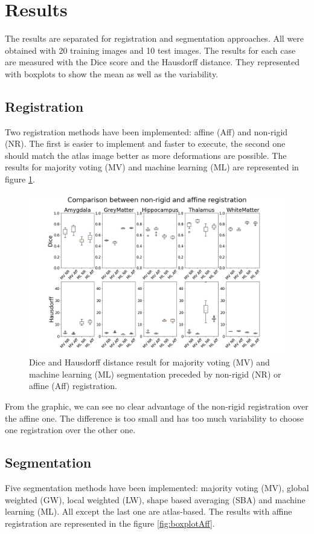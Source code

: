 \section*{Results}
The results are separated for registration and segmentation approaches. All were obtained with 20 training images and 10 test images. The results for each case are measured with the Dice score and the Hausdorff distance. They represented with boxplots to show the mean as well as the variability.

\subsection*{Registration}
Two registration methods have been implemented: affine (Aff) and non-rigid (NR). The first is easier to implement and faster to execute, the second one should match the atlas image better as more deformations are possible. The results for majority voting (MV) and machine learning (ML) are represented in figure \ref{fig:boxplotReg}.

\begin{figure}[h!]
	\centering
	\includegraphics[width = .48 \textwidth]{img/boxplotComparisonNRAff}
	\caption{Dice and Hausdorff distance result for majority voting (MV) and machine learning (ML) segmentation preceded by non-rigid (NR) or affine (Aff) registration.}
	\label{fig:boxplotReg}
\end{figure}

From the graphic, we can see no clear advantage of the non-rigid registration over the affine one. The difference is too small and has too much variability to choose one registration over the other one.

\subsection*{Segmentation}
Five segmentation methods have been implemented: majority voting (MV), global weighted (GW), local weighted (LW), shape based averaging (SBA) and machine learning (ML). All except the last one are atlas-based. The results with affine registration are represented in the figure \ref{fig:boxplotAff}.

